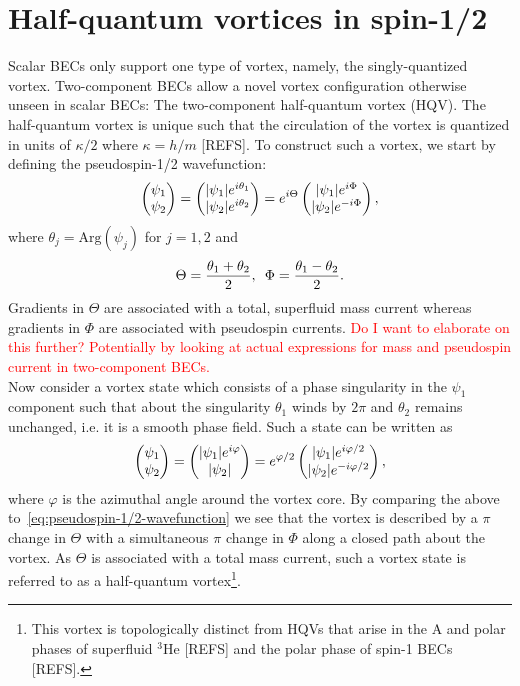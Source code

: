 \section{Half-quantum vortices in spin-1/2}
Scalar BECs only support one type of vortex, namely, the singly-quantized
vortex.
Two-component BECs allow a novel vortex configuration otherwise unseen in
scalar BECs: The two-component half-quantum 
vortex (HQV).
The half-quantum vortex is unique such that the circulation of the vortex is
quantized in units of $\kappa / 2$ where $\kappa=h/m$ [REFS].
To construct such a vortex, we start by defining the pseudospin-1/2
wavefunction:
\begin{equation}
    \begin{pmatrix}\psi_1\\\psi_2\end{pmatrix} 
    = \begin{pmatrix}|\psi_1|e^{i\theta_1}\\|\psi_2|e^{i\theta_2}\end{pmatrix}
    = e^{i\Theta}\begin{pmatrix}|\psi_1|e^{i\Phi}\\|\psi_2|e^{-i\Phi}\end{pmatrix},
    \label{eq:pseudospin-1/2-wavefunction}
\end{equation}
where $\theta_j=\mathrm{Arg}(\psi_j)$ for $j=1,2$ and
\begin{equation}
    \Theta = \frac{\theta_1 + \theta_2}{2}, \enskip 
    \Phi = \frac{\theta_1 - \theta_2}{2}.
    \label{eq:Theta-Phi}
\end{equation}
Gradients in $\Theta$ are associated with a total, superfluid mass current
whereas gradients in $\Phi$ are associated with pseudospin currents.
\textcolor{red}{Do I want to elaborate on this further? Potentially by looking
at actual expressions for mass and pseudospin current in two-component BECs.} \\
Now consider a vortex state which consists of a phase singularity in the
$\psi_1$ component such that about the singularity $\theta_1$ winds by $2\pi$
and $\theta_2$ remains unchanged, i.e. it is a smooth phase field.
Such a state can be written as
\begin{equation}
    \begin{pmatrix}\psi_1\\\psi_2\end{pmatrix} 
    = \begin{pmatrix}|\psi_1|e^{i\varphi}\\|\psi_2|\end{pmatrix}
    = e^{\varphi/2}\begin{pmatrix}|\psi_1|e^{i\varphi/2}\\|\psi_2|e^{-i\varphi/2}\end{pmatrix},
\end{equation}
where $\varphi$ is the azimuthal angle around the vortex core.
By comparing the above to~\eqref{eq:pseudospin-1/2-wavefunction} we see that
the vortex is described by a $\pi$ change in $\Theta$ with a simultaneous $\pi$
change in $\Phi$ along a closed path about the vortex.
As $\Theta$ is associated with a total mass current, such a vortex state is
referred to as a half-quantum vortex\footnote{This vortex is topologically
distinct from HQVs that arise in the A and polar phases of superfluid $^3$He
[REFS] and the polar phase of spin-1 BECs [REFS].}.
\par


